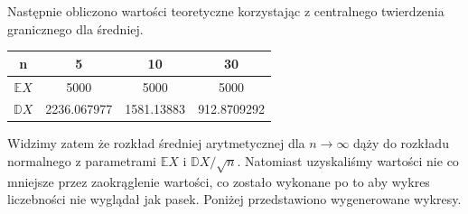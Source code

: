 \documentclass{article}
\begin{document}
Następnie obliczono wartości teoretyczne korzystając z centralnego twierdzenia granicznego dla średniej. \\
\begin{center}
\begin{tabular}{|c|c|c|c|}
\hline
n & 5 & 10 & 30 \\
\hline
$\mathbb{E}X$ & 5000 & 5000 & 5000 \\
\hline
$\mathbb{D}X$ & 2236.067977 & 1581.13883 &  912.8709292 \\
\hline
\end{tabular}
\end{center}
Widzimy zatem że rozkład średniej arytmetycznej dla $n \rightarrow \infty$ dąży do rozkładu normalnego z parametrami $\mathbb{E}X$ i $\mathbb{D}X/\sqrt{n}$. Natomiast uzyskaliśmy wartości nie co mniejsze przez zaokrąglenie wartości, co zostało wykonane po to aby wykres liczebności nie wyglądał jak pasek. Poniżej przedstawiono wygenerowane wykresy.
\end{document}
